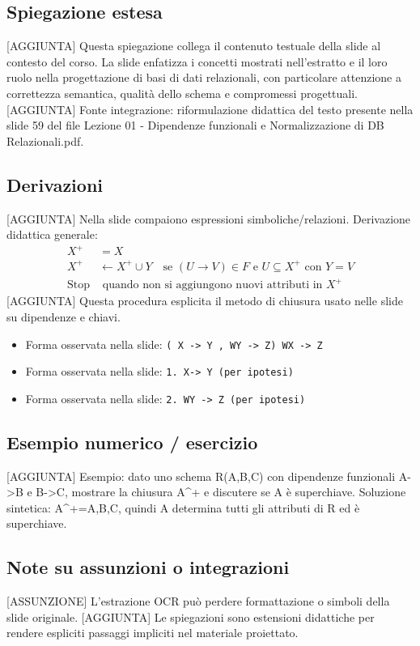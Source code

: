 \documentclass[11pt]{article}
\begin{document}
\subsection*{Spiegazione estesa}
[AGGIUNTA] Questa spiegazione collega il contenuto testuale della slide al contesto del corso. La slide enfatizza i concetti mostrati nell'estratto e il loro ruolo nella progettazione di basi di dati relazionali, con particolare attenzione a correttezza semantica, qualità dello schema e compromessi progettuali.
[AGGIUNTA] Fonte integrazione: riformulazione didattica del testo presente nella slide 59 del file Lezione 01 - Dipendenze funzionali e Normalizzazione di DB Relazionali.pdf.
\subsection*{Derivazioni}
[AGGIUNTA] Nella slide compaiono espressioni simboliche/relazioni. Derivazione didattica generale:
\begin{align*}
X^+ &= X \\
X^+ &\leftarrow X^+ \cup Y \quad \text{se } (U \to V) \in F \text{ e } U \subseteq X^+ \text{ con } Y=V \\
\text{Stop} &\text{ quando non si aggiungono nuovi attributi in } X^+
\end{align*}
[AGGIUNTA] Questa procedura esplicita il metodo di chiusura usato nelle slide su dipendenze e chiavi.
\begin{itemize}[leftmargin=*]
\item Forma osservata nella slide: \texttt{( X -> Y , WY -> Z)  WX -> Z}
\item Forma osservata nella slide: \texttt{1.   X-> Y      (per ipotesi)}
\item Forma osservata nella slide: \texttt{2.   WY -> Z    (per ipotesi)}
\end{itemize}
\subsection*{Esempio numerico / esercizio}
[AGGIUNTA] Esempio: dato uno schema R(A,B,C) con dipendenze funzionali A->B e B->C, mostrare la chiusura A^+ e discutere se A è superchiave. Soluzione sintetica: A^+={A,B,C}, quindi A determina tutti gli attributi di R ed è superchiave.
\subsection*{Note su assunzioni o integrazioni}
[ASSUNZIONE] L'estrazione OCR può perdere formattazione o simboli della slide originale.
[AGGIUNTA] Le spiegazioni sono estensioni didattiche per rendere espliciti passaggi impliciti nel materiale proiettato.
\end{document}
